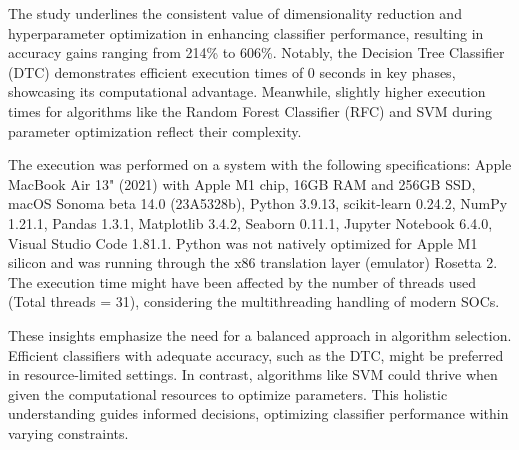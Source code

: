 \documentclass[conference,onecolumn]{IEEEtran}
\begin{document}
    The study underlines the consistent value of dimensionality reduction and hyperparameter optimization in enhancing classifier performance, resulting in accuracy gains ranging from 214\% to 606\%. Notably, the Decision Tree Classifier (DTC) demonstrates efficient execution times of 0 seconds in key phases, showcasing its computational advantage. Meanwhile, slightly higher execution times for algorithms like the Random Forest Classifier (RFC) and SVM during parameter optimization reflect their complexity.

    The execution was performed on a system with the following specifications: Apple MacBook Air 13" (2021) with Apple M1 chip, 16GB RAM and 256GB SSD, macOS Sonoma beta 14.0 (23A5328b), Python 3.9.13, scikit-learn 0.24.2, NumPy 1.21.1, Pandas 1.3.1, Matplotlib 3.4.2, Seaborn 0.11.1, Jupyter Notebook 6.4.0, Visual Studio Code 1.81.1. Python was not natively optimized for Apple M1 silicon and was running through the x86 translation layer (emulator) Rosetta 2. The execution time might have been affected by the number of threads used (Total threads = 31), considering the multithreading handling of modern SOCs.

    These insights emphasize the need for a balanced approach in algorithm selection. Efficient classifiers with adequate accuracy, such as the DTC, might be preferred in resource-limited settings. In contrast, algorithms like SVM could thrive when given the computational resources to optimize parameters. This holistic understanding guides informed decisions, optimizing classifier performance within varying constraints.


\newpage
\appendix



\end{document}
